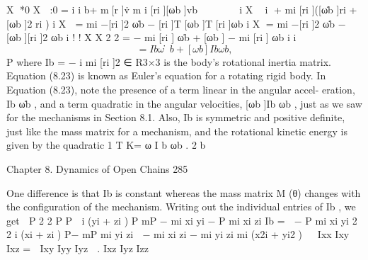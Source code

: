 \documentclass[12pt,a4paper]{article}
\begin{document}
                              X       *0 X
                                                                 :0
                        =        i i b+
                                m[r ]v̇           m i [ri ][ωb ]vb
                                                                 
                                   
                                                         
                             i X
                                            i
                             +    mi [ri ]([ω̇b ]ri + [ωb ]2 ri )
                                   i
                              X                                               
                        =           mi −[ri ]2 ω̇b − [ri ]T [ωb ]T [ri ]ωb
                               i
                              X                                       
                        =           mi −[ri ]2 ω̇b − [ωb ][ri ]2 ωb
                               i
                                                      !                                  !
                                    X                                     X
                                                  2                                  2
                        =       −          mi [ri ]       ω̇b + [ωb ] −       mi [ri ]       ωb
                                       i                                  i
\begin{equation}
= Ib ω̇b + [ωb ]Ib ωb ,
\label{eq:8.23}
\end{equation}
                    P
where Ib = − i mi [ri ]2 ∈ R3×3 is the body’s rotational inertia matrix.
Equation (8.23) is known as Euler’s equation for a rotating rigid body.
    In Equation (8.23), note the presence of a term linear in the angular accel-
eration, Ib ω̇b , and a term quadratic in the angular velocities, [ωb ]Ib ωb , just as
we saw for the mechanisms in Section 8.1. Also, Ib is symmetric and positive
definite, just like the mass matrix for a mechanism, and the rotational kinetic
energy is given by the quadratic
                                                      1 T
                                              K=       ω I b ωb .
                                                      2 b


Chapter 8. Dynamics of Open Chains                                                                  285

One difference is that Ib is constant whereas the mass matrix M (θ) changes
with the configuration of the mechanism.
   Writing out the individual entries of Ib , we get
                  P        2    2
                                         P               P              
                        i (yi + zi ) P
                       mP              − mi xi yi      − P mi xi zi
        Ib =  − P mi xi yi                   2   2
                                         i (xi + zi ) P−
                                        mP                  mi yi zi 
                     − mi xi zi        − mi yi zi       mi (x2i + yi2 )
                                    
                    Ixx Ixy Ixz
             =  Ixy Iyy Iyz  .
                    Ixz Iyz Izz
\end{document}
